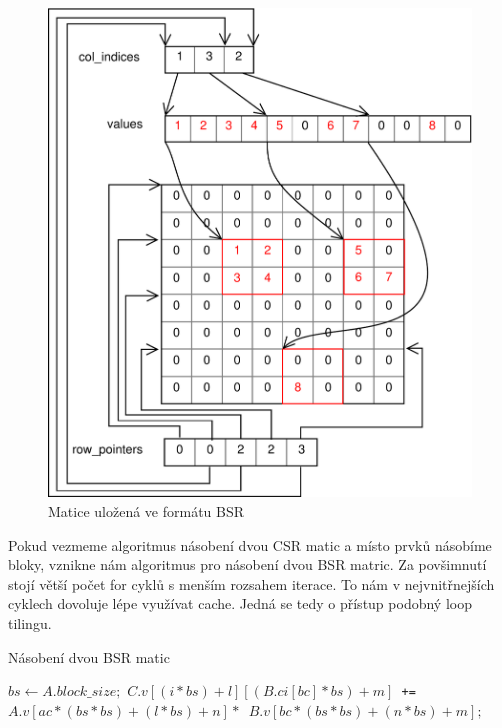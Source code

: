 \begin{figure}[H]\centering
	\includegraphics[width=\textwidth]{./images/bsr/bsr}
	\caption{Matice uložená ve formátu BSR}
	\label{fig:CSR}
\end{figure}


Pokud vezmeme algoritmus násobení dvou CSR matic a místo prvků násobíme bloky, vznikne nám algoritmus pro násobení dvou BSR matric. Za povšimnutí stojí větší počet for cyklů s menším rozsahem iterace. To nám v nejvnitřnejších cyklech dovoluje lépe využívat cache. Jedná se tedy o přístup podobný loop tilingu.

\label{alg:bsr-mmm}
\begin{algorithm}[H]
	\caption{Násobení dvou BSR matic}\label{bsr-mmm}
	\begin{algorithmic}[1]
		\State \texttt{$bs\gets A.block\_size;$}
								\State \texttt{$C.v[(i * bs) + l][(B.ci[bc] * bs) + m]$ += \\
									$ A.v[ac * (bs * bs) + (l * bs) + n] *$
									$ B.v[bc * (bs * bs) + (n * bs) + m];$}
							\EndFor
						\EndFor
					\EndFor
				\EndFor
			\EndFor
		\EndFor
		\EndProcedure
	\end{algorithmic}
\end{algorithm}



